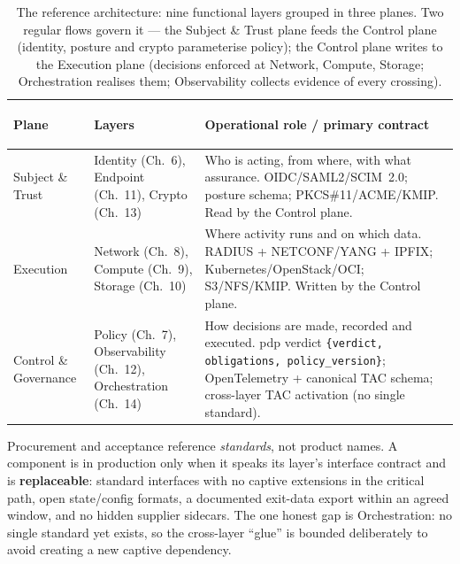 \documentclass[11pt,a4paper]{article}
\newcommand{\keyword}[1]{\textbf{#1}}
\begin{document}
\begin{table}[h!]
\centering\small
\renewcommand{\arraystretch}{1.15}
\begin{tabularx}{\textwidth}{
  >{\bfseries\raggedright\arraybackslash}p{3.0cm}
  >{\raggedright\arraybackslash}p{3.3cm}
  >{\raggedright\arraybackslash}X}
\toprule
\textbf{Plane} & \textbf{Layers} & \textbf{Operational role / primary contract} \\
\midrule
Subject \& Trust &
  Identity (Ch.~6), Endpoint (Ch.~11), Crypto (Ch.~13) &
  Who is acting, from where, with what assurance. OIDC/SAML2/SCIM~2.0;
  posture schema; PKCS\#11/ACME/KMIP. Read by the Control plane. \\
\addlinespace
Execution &
  Network (Ch.~8), Compute (Ch.~9), Storage (Ch.~10) &
  Where activity runs and on which data. RADIUS + NETCONF/YANG + IPFIX;
  Kubernetes/OpenStack/OCI; S3/NFS/KMIP. Written by the Control plane. \\
\addlinespace
Control \& Governance &
  Policy (Ch.~7), Observability (Ch.~12), Orchestration (Ch.~14) &
  How decisions are made, recorded and executed. \gls{pdp} verdict
  \texttt{\{verdict, obligations, policy\_version\}}; OpenTelemetry +
  canonical TAC schema; cross-layer TAC activation (no single standard). \\
\bottomrule
\end{tabularx}
\caption{The reference architecture: nine functional layers grouped in three
planes. Two regular flows govern it --- the Subject \& Trust plane feeds the
Control plane (identity, posture and crypto parameterise policy); the Control
plane writes to the Execution plane (decisions enforced at Network, Compute,
Storage; Orchestration realises them; Observability collects evidence of every
crossing).}
\end{table}

\begin{principlebox}
Procurement and acceptance reference \emph{standards}, not product names. A
component is in production only when it speaks its layer's interface contract
and is \keyword{replaceable}: standard interfaces with no captive extensions
in the critical path, open state/config formats, a documented exit-data
export within an agreed window, and no hidden supplier sidecars. The one
honest gap is Orchestration: no single standard yet exists, so the
cross-layer ``glue'' is bounded deliberately to avoid creating a new captive
dependency.
\end{principlebox}
\end{document}
